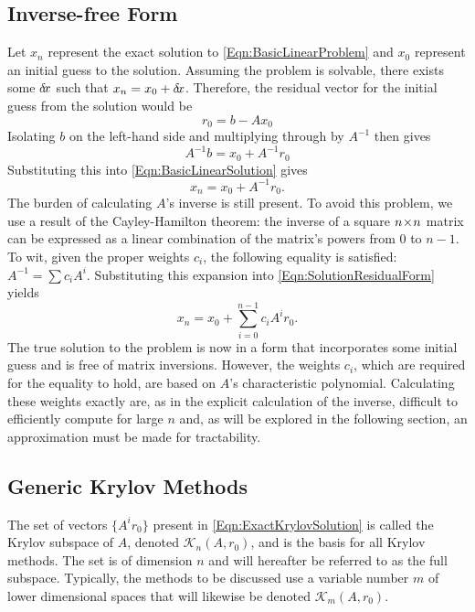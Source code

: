 \documentclass[12pt]{UWMadThesis}
\begin{document}
\subsection{Inverse-free Form}
Let $x_n$ represent the exact solution to \cref{Eqn:BasicLinearProblem} and $x_0$ represent an initial guess to the solution.
Assuming the problem is solvable, there exists some $\delta \mkern-3.00mu x$ such that $x_n = x_0 + \delta \mkern-3.00mu x$.
Therefore, the residual vector for the initial guess from the solution would be
\begin{equation}
    r_0 = b - A x_0
    \label{Eqn:InitialResidual}
\end{equation}
Isolating $b$ on the left-hand side and multiplying through by $A^{-1}$ then gives
\begin{equation}
    A^{-1} b = x_0 + A^{-1} r_0
\end{equation}
Substituting this into \cref{Eqn:BasicLinearSolution} gives
\begin{equation}
    x_n = x_0 + A^{-1} r_0.
    \label{Eqn:SolutionResidualForm}
\end{equation}
The burden of calculating $A$'s inverse is still present.
To avoid this problem, we use a result of the Cayley-Hamilton theorem: the inverse of a square $n \!\times\! n$ matrix can be expressed as a linear combination of the matrix's powers from $0$ to $n-1$.
To wit, given the proper weights $c_i$, the following equality is satisfied: $A^{-1} = \sum c_i A^i$.
Substituting this expansion into \cref{Eqn:SolutionResidualForm} yields
\begin{equation}
    x_n = x_0 + \sum_{i = 0}^{n-1} c_i A^i r_0.
    \label{Eqn:ExactKrylovSolution}
\end{equation}
The true solution to the problem is now in a form that incorporates some initial guess and is free of matrix inversions.
However, the weights $c_i$, which are required for the equality to hold, are based on $A$'s characteristic polynomial.
Calculating these weights exactly are, as in the explicit calculation of the inverse, difficult to efficiently compute for large $n$ and, as will be explored in the following section, an approximation must be made for tractability.


\subsection{Generic Krylov Methods}

The set of vectors $\{A^i r_0\}$ present in \cref{Eqn:ExactKrylovSolution} is called the Krylov subspace of $A$, denoted $\mathcal{K}_n(A,r_0)$, and is the basis for all Krylov methods.
The set is of dimension $n$ and will hereafter be referred to as the full subspace.
Typically, the methods to be discussed use a variable number $m$ of lower dimensional spaces that will likewise be denoted $\mathcal{K}_m(A,r_0)$.
\end{document}
